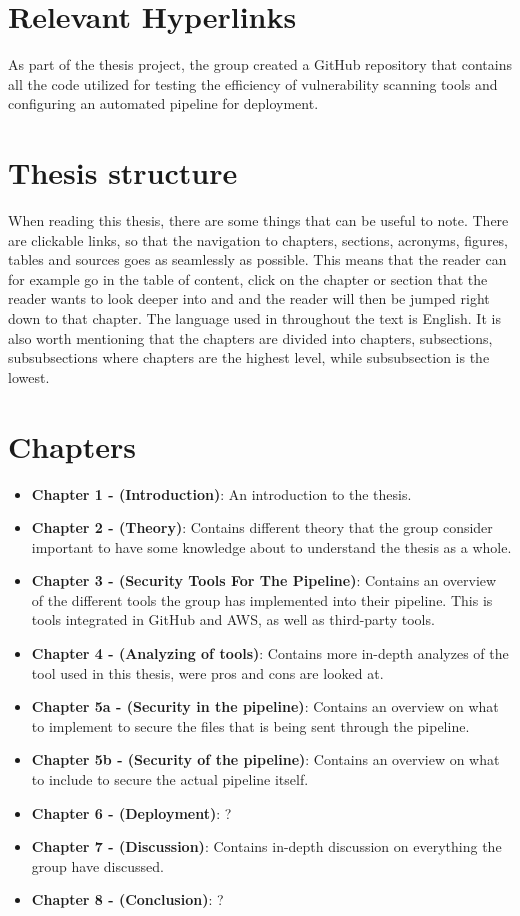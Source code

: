 \section{Relevant Hyperlinks}
As part of the thesis project, the group created a GitHub repository that contains all the code utilized for testing the efficiency of vulnerability scanning tools and configuring an automated pipeline for deployment. 



\section{Thesis structure}
When reading this thesis, there are some things that can be useful to note. There are clickable links, so that the navigation to chapters, sections, acronyms, figures, tables and sources goes as seamlessly as possible. This means that the reader can for example go in the table of content, click on the chapter or section that the reader wants to look deeper into and and the reader will then be jumped right down to that chapter. The language used in throughout the text is English. It is also worth mentioning that the chapters are divided into chapters, subsections, subsubsections where chapters are the highest level, while subsubsection is the lowest. 
\section{Chapters}
\begin{itemize}
    \item \textbf{Chapter 1 - (Introduction)}: An introduction to the thesis.
    \item \textbf{Chapter 2 - (Theory)}: Contains different theory that the group consider important 
    to have some knowledge about to understand the thesis as a whole.
    \item \textbf{Chapter 3 - (Security Tools For The Pipeline)}: Contains an overview of the different tools the group has implemented into their pipeline. This is tools integrated in GitHub and AWS, as well as third-party tools. 
    \item \textbf{Chapter 4 - (Analyzing of tools)}: Contains more in-depth analyzes of the tool used in this thesis, were pros and cons are looked at. 
    \item \textbf{Chapter 5a - (Security in the pipeline)}: Contains an overview on what to implement to secure the files that is being sent through the pipeline. 
    \item \textbf{Chapter 5b - (Security of the pipeline)}: Contains an overview on what to include to secure the actual pipeline itself. 
    \item \textbf{Chapter 6 - (Deployment)}: ?
    \item \textbf{Chapter 7 - (Discussion)}: Contains in-depth discussion on everything the group have discussed. 
    \item \textbf{Chapter 8 - (Conclusion)}: ?

\end{itemize}






